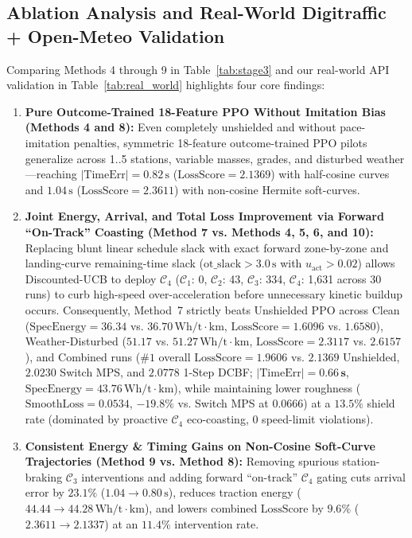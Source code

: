 \documentclass[10pt,a4paper]{article}
\begin{document}
\subsection{Ablation Analysis and Real-World Digitraffic + Open-Meteo Validation}
Comparing Methods 4 through 9 in Table~\ref{tab:stage3} and our real-world API validation in Table~\ref{tab:real_world} highlights four core findings:
\begin{enumerate}
    \item \textbf{Pure Outcome-Trained 18-Feature PPO Without Imitation Bias (Methods 4 and 8):} Even completely unshielded and without pace-imitation penalties, symmetric 18-feature outcome-trained PPO pilots generalize across 1..5 stations, variable masses, grades, and disturbed weather—reaching $|\text{TimeErr}| = 0.82\,\text{s}$ ($\text{LossScore} = 2.1369$) with half-cosine curves and $1.04\,\text{s}$ ($\text{LossScore} = 2.3611$) with non-cosine Hermite soft-curves.
    \item \textbf{Joint Energy, Arrival, and Total Loss Improvement via Forward ``On-Track'' Coasting (Method 7 vs. Methods 4, 5, 6, and 10):} Replacing blunt linear schedule slack with exact forward zone-by-zone and landing-curve remaining-time slack ($\text{ot\_slack} > 3.0\,\text{s}$ with $u_{\text{act}} > 0.02$) allows Discounted-UCB to deploy $\mathcal{C}_4$ ($\mathcal{C}_1$: 0, $\mathcal{C}_2$: 43, $\mathcal{C}_3$: 334, $\mathcal{C}_4$: 1,631 across 30 runs) to curb high-speed over-acceleration before unnecessary kinetic buildup occurs. Consequently, Method~7 strictly beats Unshielded PPO across Clean ($\text{SpecEnergy} = 36.34$ vs. $36.70\,\text{Wh/t}\cdot\text{km}$, $\text{LossScore} = 1.6096$ vs. $1.6580$), Weather-Disturbed ($51.17$ vs. $51.27\,\text{Wh/t}\cdot\text{km}$, $\text{LossScore} = 2.3117$ vs. $2.6157$), and Combined runs ($\#1$ overall $\text{LossScore} = \mathbf{1.9606}$ vs. $2.1369$ Unshielded, $2.0230$ Switch MPS, and $2.0778$ 1-Step DCBF; $|\text{TimeErr}| = \mathbf{0.66\,\text{s}}$, $\text{SpecEnergy} = \mathbf{43.76}\,\text{Wh/t}\cdot\text{km}$), while maintaining lower roughness ($\text{SmoothLoss} = 0.0534$, $-19.8\%$ vs. Switch MPS at $0.0666$) at a $13.5\%$ shield rate (dominated by proactive $\mathcal{C}_4$ eco-coasting, $0$ speed-limit violations).
    \item \textbf{Consistent Energy & Timing Gains on Non-Cosine Soft-Curve Trajectories (Method 9 vs. Method 8):} Removing spurious station-braking $\mathcal{C}_3$ interventions and adding forward ``on-track'' $\mathcal{C}_4$ gating cuts arrival error by $23.1\%$ ($1.04 \to 0.80\,\text{s}$), reduces traction energy ($44.44 \to 44.28\,\text{Wh/t}\cdot\text{km}$), and lowers combined $\text{LossScore}$ by $9.6\%$ ($2.3611 \to 2.1337$) at an $11.4\%$ intervention rate.

\end{enumerate}
\end{document}

